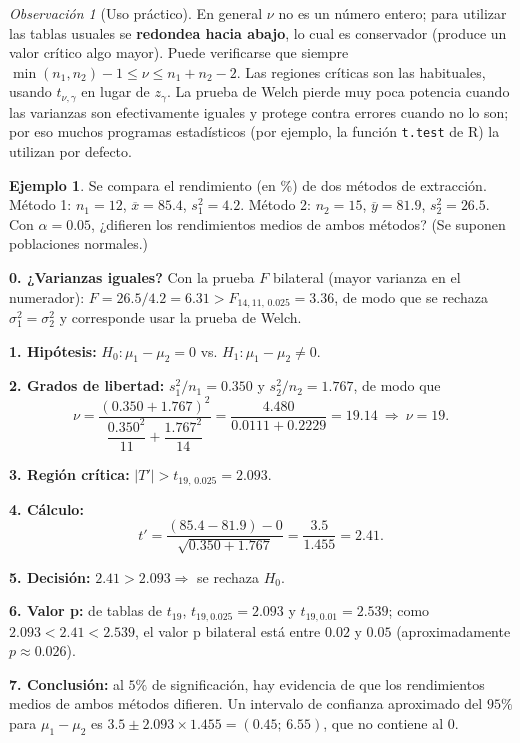 \documentclass[11pt,a4paper]{article}
\theoremstyle{plain}
\theoremstyle{definition}
\newtheorem{ejemplo}[teorema]{Ejemplo}
\theoremstyle{remark}
\newtheorem{observacion}[teorema]{Observación}
\begin{document}
\begin{observacion}[Uso práctico]
En general $\nu$ no es un número entero; para utilizar las tablas usuales se \textbf{redondea hacia abajo}, lo cual es conservador (produce un valor crítico algo mayor). Puede verificarse que siempre $\min(n_1,n_2)-1\le\nu\le n_1+n_2-2$. Las regiones críticas son las habituales, usando $t_{\nu,\gamma}$ en lugar de $z_\gamma$. La prueba de Welch pierde muy poca potencia cuando las varianzas son efectivamente iguales y protege contra errores cuando no lo son; por eso muchos programas estadísticos (por ejemplo, la función \texttt{t.test} de R) la utilizan por defecto.
\end{observacion}

\begin{ejemplo}
Se compara el rendimiento (en \%) de dos métodos de extracción. Método 1: $n_1=12$, $\overline x=85.4$, $s_1^2=4.2$. Método 2: $n_2=15$, $\overline y=81.9$, $s_2^2=26.5$. Con $\alpha=0.05$, ¿difieren los rendimientos medios de ambos métodos? (Se suponen poblaciones normales.)

\textbf{0. ¿Varianzas iguales?} Con la prueba $F$ bilateral (mayor varianza en el numerador): $F=26.5/4.2=6.31>F_{14,11,\,0.025}=3.36$, de modo que se rechaza $\sigma_1^2=\sigma_2^2$ y corresponde usar la prueba de Welch.

\textbf{1. Hipótesis:} $H_0:\mu_1-\mu_2=0$ vs. $H_1:\mu_1-\mu_2\neq0$.

\textbf{2. Grados de libertad:} $s_1^2/n_1=0.350$ y $s_2^2/n_2=1.767$, de modo que
\[
\nu=\frac{(0.350+1.767)^2}{\dfrac{0.350^2}{11}+\dfrac{1.767^2}{14}}=\frac{4.480}{0.0111+0.2229}=19.14 \ \Rightarrow\ \nu=19.
\]

\textbf{3. Región crítica:} $|T'|>t_{19,\,0.025}=2.093$.

\textbf{4. Cálculo:}
\[
t'=\frac{(85.4-81.9)-0}{\sqrt{0.350+1.767}}=\frac{3.5}{1.455}=2.41.
\]

\textbf{5. Decisión:} $2.41>2.093\Rightarrow$ se rechaza $H_0$.

\textbf{6. Valor p:} de tablas de $t_{19}$, $t_{19,0.025}=2.093$ y $t_{19,0.01}=2.539$; como $2.093<2.41<2.539$, el valor p bilateral está entre $0.02$ y $0.05$ (aproximadamente $p\approx0.026$).

\textbf{7. Conclusión:} al $5\%$ de significación, hay evidencia de que los rendimientos medios de ambos métodos difieren. Un intervalo de confianza aproximado del $95\%$ para $\mu_1-\mu_2$ es $3.5\pm2.093\times1.455=(0.45;\,6.55)$, que no contiene al $0$.
\end{ejemplo}
\end{document}
